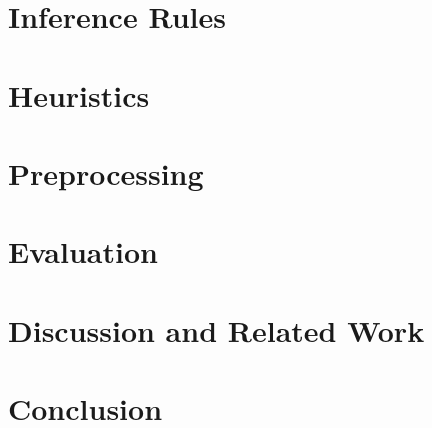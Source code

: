


\section{Inference Rules}
\label{sec:ehoh:inferences}

\section{Heuristics}
\label{sec:ehoh:heuristics}

\section{Preprocessing}
\label{sec:ehoh:preprocessing}

\section{Evaluation}
\label{sec:ehoh:evaluation}

\section{Discussion and Related Work}
\label{sec:ehoh:discussion-and-related-work}

\section{Conclusion}
\label{sec:ehoh:conclusion}
